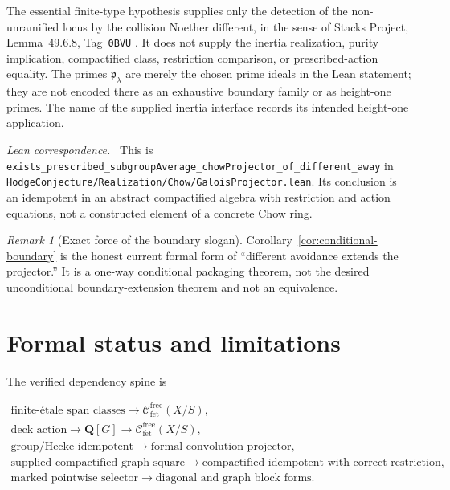 \documentclass[11pt]{article}
\theoremstyle{definition}
\theoremstyle{remark}
\newtheorem*{remark}{Remark}
\newcommand{\Q}{\mathbf Q}
\newcommand{\fe}{\mathrm{f\acute et}}
\newcommand{\leanpath}[1]{\texttt{\nolinkurl{#1}}}
\newcommand{\chowsrc}[1]{%
  \leanpath{HodgeConjecture/Realization/Chow/#1}}
\newenvironment{leanfiles}
  {\par\medskip\begingroup\footnotesize\raggedright\noindent
   \textit{Lean correspondence.}\ }
  {\par\endgroup\medskip}
\begin{document}
The essential finite-type hypothesis supplies only the detection of the
non-unramified locus by the collision Noether different, in the sense of
Stacks Project, Lemma~49.6.8, Tag~\texttt{0BVU}
\cite{StacksNoetherDifferent}.  It does not supply the inertia realization,
purity implication, compactified class, restriction comparison, or
prescribed-action equality.  The primes \(\mathfrak p_\lambda\) are merely the chosen prime
ideals in the Lean statement; they are not encoded there as an exhaustive
boundary family or as height-one primes.  The name of the supplied inertia
interface records its intended height-one application.

\begin{leanfiles}
This is
\leanpath{exists_prescribed_subgroupAverage_chowProjector_of_different_away}
in \chowsrc{GaloisProjector.lean}.  Its conclusion is an idempotent in an
abstract compactified algebra with restriction and action equations, not a
constructed element of a concrete Chow ring.
\end{leanfiles}

\begin{remark}[Exact force of the boundary slogan]
Corollary~\ref{cor:conditional-boundary} is the honest current formal form of
``different avoidance extends the projector.''  It is a one-way conditional
packaging theorem, not the desired unconditional boundary-extension theorem
and not an equivalence.
\end{remark}

\section{Formal status and limitations}
\label{sec:status}

The verified dependency spine is

\[
\begin{gathered}
  \text{finite-\'etale span classes}
  \longrightarrow
  \mathcal C_{\fe}^{\mathrm{free}}(X/S),\\
  \text{deck action}
  \longrightarrow
  \Q[G]\longrightarrow
  \mathcal C_{\fe}^{\mathrm{free}}(X/S),\\
  \text{group/Hecke idempotent}
  \longrightarrow
  \text{formal convolution projector},\\
  \text{supplied compactified graph square}
  \longrightarrow
  \text{compactified idempotent with correct restriction},\\
  \text{marked pointwise selector}
  \longrightarrow
  \text{diagonal and graph block forms}.
\end{gathered}
\]
\end{document}
